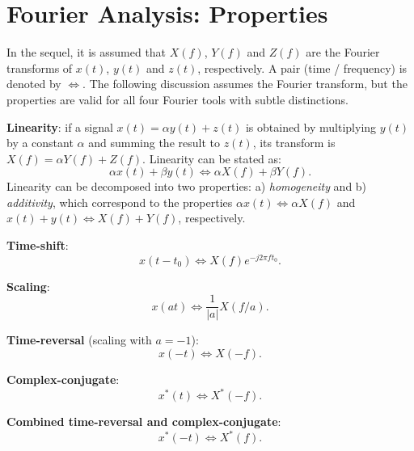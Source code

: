 \section{Fourier Analysis: Properties}
\label{sec:fourierProperties}

In the sequel, it is assumed that $X(f)$, $Y(f)$ and $Z(f)$ are the Fourier transforms of $x(t)$, $y(t)$ and $z(t)$, respectively. A pair (time / frequency) is denoted by $\Leftrightarrow$. The following discussion assumes the Fourier transform, but the properties are valid for all four Fourier tools with subtle distinctions.

\textbf{Linearity}: if  a signal $x(t)=\alpha y(t) + z(t)$ is obtained by multiplying $y(t)$ by a constant $\alpha$ and summing the result to $z(t)$, its transform is $X(f) = \alpha Y(f) + Z(f)$. Linearity can be stated as:
\begin{equation}
\alpha x(t) + \beta y(t) \Leftrightarrow \alpha X(f) + \beta Y(f).
\label{eq:fourierLinearity}
\end{equation}
Linearity can be decomposed into two properties: a) \emph{homogeneity} and b) \emph{additivity}, which correspond to the properties $\alpha x(t) \Leftrightarrow \alpha X(f)$ and $x(t) + y(t) \Leftrightarrow X(f) + Y(f)$, respectively.

\textbf{Time-shift}: 
\begin{equation}
x(t-t_0) \Leftrightarrow X(f) e^{-j 2 \pi f t_0}.
\label{eq:fourierTimeShift}
\end{equation}


\textbf{Scaling}: 
\begin{equation}
x(at) \Leftrightarrow \frac{1}{|a|}X(f/a).
\label{eq:fourierScaling}
\end{equation}

\textbf{Time-reversal} (scaling with $a=-1$): 
\begin{equation}
x(-t) \Leftrightarrow X(-f).
\label{eq:fourierTimeReversal}
\end{equation}

\textbf{Complex-conjugate}: 
\begin{equation}
x^*(t) \Leftrightarrow X^*(-f).
\label{eq:fourierComplexConj}
\end{equation}

\textbf{Combined time-reversal and complex-conjugate}: 
\begin{equation}
x^*(-t) \Leftrightarrow X^*(f).
\label{eq:fourierTimeRevComplexConj}
\end{equation}

